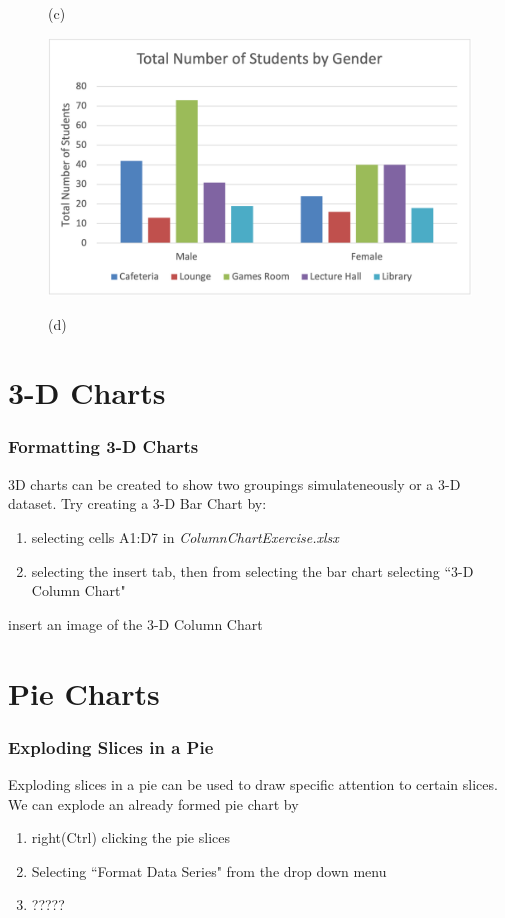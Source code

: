 \documentclass[12pt]{beamer}
\begin{document}
\begin{frame}
\begin{figure}[htb]
\begin{minipage}[t]{0.45\linewidth}
			\medskip
			\centerline{(c)}
		\end{minipage}
		\begin{minipage}[t]{0.45\linewidth}\centering
		\includegraphics[width=0.9\linewidth]{Exercise1ByGender.png}
		\medskip
		\centerline{(d)}
	\end{minipage}
	\end{figure}
\end{frame}
\section{3-D Charts}
	\begin{frame}
		\frametitle{Formatting 3-D Charts}
		3D charts can be created to show two groupings simulateneously or a 3-D dataset. 
		Try creating a 3-D  Bar Chart by:
		\begin{enumerate}
			\item selecting cells A1:D7 in \textit{ColumnChartExercise.xlsx}
			\item selecting the insert tab, then from selecting the bar chart selecting ``3-D Column Chart"
		\end{enumerate}
		insert an image of the 3-D Column Chart 
	\end{frame}
\section{Pie Charts}
\begin{frame}
	\frametitle{Exploding Slices in a Pie}
	Exploding slices in a pie can be used to draw specific attention to certain slices. We can explode an already formed pie chart by 
	\begin{enumerate}
		\item right(Ctrl) clicking the pie slices
		\item Selecting ``Format Data Series" from the drop down menu
		\item ?????
	\end{enumerate}
\end{frame}
\end{document}
